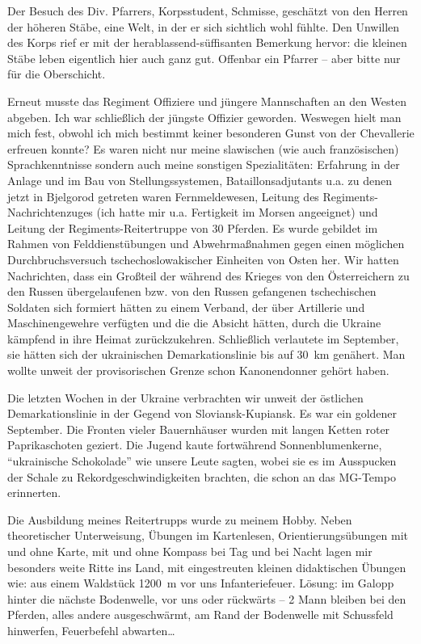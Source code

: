 \documentclass[a5paper,pagesize,10pt,twoside=true]{scrbook}
\renewcommand{\marginpar}[2][]{}
\begin{document}
Der Besuch des Div. Pfarrers, Korpsstudent, Schmisse, geschätzt von den Herren der höheren Stäbe, eine Welt, in der er sich sichtlich wohl fühlte. Den Unwillen des Korps rief er mit der herablassend-süffisanten Bemerkung hervor: die kleinen Stäbe leben eigentlich hier auch ganz gut. Offenbar ein Pfarrer -- aber bitte nur für die Oberschicht.

Erneut musste das Regiment Offiziere und jüngere Mannschaften an den Westen abgeben. Ich war schließlich der jüngste Offizier geworden. Weswegen hielt man mich fest, obwohl ich mich bestimmt keiner besonderen Gunst von der Chevallerie erfreuen konnte? Es waren nicht nur meine slawischen (wie auch französischen) Sprachkenntnisse sondern auch meine sonstigen Spezialitäten: Erfahrung in der Anlage und im Bau von Stellungssystemen, Bataillonsadjutants u.a. zu denen jetzt in Bjelgorod getreten waren Fernmeldewesen, Leitung des Regiments-Nachrichtenzuges (ich hatte mir u.a. Fertigkeit im Morsen angeeignet) und Leitung der Regiments-Reitertruppe von 30 Pferden. Es wurde gebildet im Rahmen von Felddienstübungen und Abwehrmaßnahmen gegen einen möglichen Durchbruchsversuch tschechoslowakischer Einheiten von Osten her. Wir hatten Nachrichten, dass ein Großteil der während des Krieges von den Österreichern zu den Russen übergelaufenen bzw. von den Russen gefangenen tschechischen Soldaten sich formiert hätten zu einem Verband, der über Artillerie und Maschinengewehre verfügten und die die Absicht hätten, durch die Ukraine kämpfend in ihre Heimat zurückzukehren. Schließlich verlautete im September, sie hätten sich der ukrainischen Demarkationslinie bis auf 30~km genähert. Man wollte unweit der provisorischen Grenze schon Kanonendonner gehört haben.

\marginpar{376}
Die letzten Wochen in der Ukraine verbrachten wir unweit der östlichen Demarkationslinie in der Gegend von Sloviansk-Kupiansk. Es war ein goldener September. Die Fronten vieler Bauernhäuser wurden mit langen Ketten roter Paprikaschoten geziert. Die Jugend kaute fortwährend Sonnenblumenkerne, \enquote{ukrainische Schokolade} wie unsere Leute sagten, wobei sie es im Ausspucken der Schale zu Rekordgeschwindigkeiten brachten, die schon an das MG-Tempo erinnerten.

Die Ausbildung meines Reitertrupps wurde zu meinem Hobby. Neben theoretischer Unterweisung, Übungen im Kartenlesen, Orientierungsübungen mit und ohne Karte, mit und ohne Kompass bei Tag und bei Nacht lagen mir besonders weite Ritte ins Land, mit eingestreuten kleinen didaktischen Übungen wie: aus einem Waldstück 1200~m vor uns Infanteriefeuer. Lösung: im Galopp hinter die nächste Bodenwelle, vor uns oder rückwärts -- 2 Mann bleiben bei den Pferden, alles andere ausgeschwärmt, am Rand der Bodenwelle mit Schussfeld hinwerfen, Feuerbefehl abwarten\dots
\end{document}

